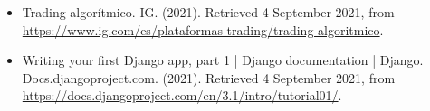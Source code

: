 \begin{itemize}
\item Trading algorítmico. IG. (2021). Retrieved 4 September 2021, from \href{https://www.ig.com/es/plataformas-trading/trading-algoritmico}{https://www.ig.com/es/plataformas-trading/trading-algoritmico}.\newline

\item Writing your first Django app, part 1 | Django documentation | Django. Docs.djangoproject.com. (2021). Retrieved 4 September 2021, from \href{https://docs.djangoproject.com/en/3.1/intro/tutorial01/}{https://docs.djangoproject.com/en/3.1/intro/tutorial01/}.\newline

\end{itemize}



